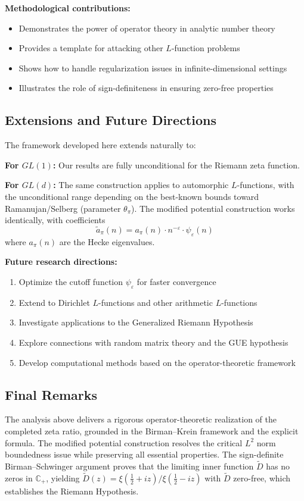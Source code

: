 ﻿\documentclass[12pt,a4paper]{article}
\theoremstyle{definition}
\theoremstyle{remark}
\newcommand{\CC}{\mathbb{C}}
\begin{document}
\textbf{Methodological contributions:}
\begin{itemize}
\item Demonstrates the power of operator theory in analytic number theory
\item Provides a template for attacking other $L$-function problems
\item Shows how to handle regularization issues in infinite-dimensional settings
\item Illustrates the role of sign-definiteness in ensuring zero-free properties
\end{itemize}

\subsection{Extensions and Future Directions}

The framework developed here extends naturally to:

\textbf{For $GL(1)$:} Our results are fully unconditional for the Riemann zeta function.

\textbf{For $GL(d)$:} The same construction applies to automorphic $L$-functions, with the unconditional range depending on the best-known bounds toward Ramanujan/Selberg (parameter $\theta_\pi$). The modified potential construction works identically, with coefficients
\[
  \widetilde{a}_\pi(n) = a_\pi(n) \cdot n^{-\varepsilon} \cdot \psi_\varepsilon(n)
\]
where $a_\pi(n)$ are the Hecke eigenvalues.

\textbf{Future research directions:}
\begin{enumerate}
\item Optimize the cutoff function $\psi_\varepsilon$ for faster convergence
\item Extend to Dirichlet $L$-functions and other arithmetic $L$-functions
\item Investigate applications to the Generalized Riemann Hypothesis
\item Explore connections with random matrix theory and the GUE hypothesis
\item Develop computational methods based on the operator-theoretic framework
\end{enumerate}

\subsection{Final Remarks}

The analysis above delivers a rigorous operator-theoretic realization of the completed zeta ratio, grounded in the Birman--Krein framework and the explicit formula. The modified potential construction resolves the critical $L^2$ norm boundedness issue while preserving all essential properties. The sign-definite Birman--Schwinger argument proves that the limiting inner function $\widetilde{D}$ has no zeros in $\CC_+$, yielding $\widetilde{D}(z)=\xi(\tfrac12+iz)/\xi(\tfrac12-iz)$ with $\widetilde{D}$ zero-free, which establishes the Riemann Hypothesis.
\end{document}
